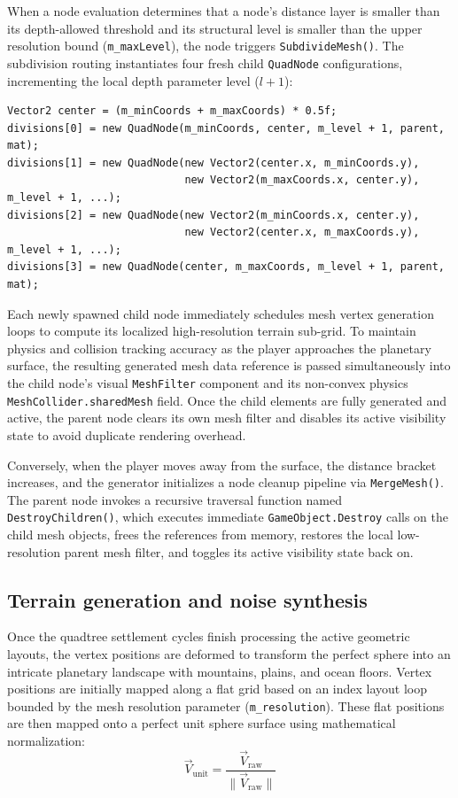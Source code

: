 \documentclass[12pt]{report}
\begin{document}
When a node evaluation determines that a node's distance layer is smaller than its depth-allowed threshold and its structural level is smaller than the upper resolution bound (\texttt{m\_maxLevel}), the node triggers \texttt{SubdivideMesh()}. The subdivision routing instantiates four fresh child \texttt{QuadNode} configurations, incrementing the local depth parameter level ($l+1$):

\begin{verbatim}
Vector2 center = (m_minCoords + m_maxCoords) * 0.5f;
divisions[0] = new QuadNode(m_minCoords, center, m_level + 1, parent, mat);
divisions[1] = new QuadNode(new Vector2(center.x, m_minCoords.y), 
                            new Vector2(m_maxCoords.x, center.y), m_level + 1, ...);
divisions[2] = new QuadNode(new Vector2(m_minCoords.x, center.y), 
                            new Vector2(center.x, m_maxCoords.y), m_level + 1, ...);
divisions[3] = new QuadNode(center, m_maxCoords, m_level + 1, parent, mat);
\end{verbatim}

Each newly spawned child node immediately schedules mesh vertex generation loops to compute its localized high-resolution terrain sub-grid. To maintain physics and collision tracking accuracy as the player approaches the planetary surface, the resulting generated mesh data reference is passed simultaneously into the child node's visual \texttt{MeshFilter} component and its non-convex physics \texttt{MeshCollider.sharedMesh} field. Once the child elements are fully generated and active, the parent node clears its own mesh filter and disables its active visibility state to avoid duplicate rendering overhead.

Conversely, when the player moves away from the surface, the distance bracket increases, and the generator initializes a node cleanup pipeline via \texttt{MergeMesh()}. The parent node invokes a recursive traversal function named \texttt{DestroyChildren()}, which executes immediate \texttt{GameObject.Destroy} calls on the child mesh objects, frees the references from memory, restores the local low-resolution parent mesh filter, and toggles its active visibility state back on.

\subsection{Terrain generation and noise synthesis}

Once the quadtree settlement cycles finish processing the active geometric layouts, the vertex positions are deformed to transform the perfect sphere into an intricate planetary landscape with mountains, plains, and ocean floors. Vertex positions are initially mapped along a flat grid based on an index layout loop bounded by the mesh resolution parameter (\texttt{m\_resolution}). These flat positions are then mapped onto a perfect unit sphere surface using mathematical normalization:
\begin{equation}
\vec{V}_{\text{unit}} = \frac{\vec{V}_{\text{raw}}}{\|\vec{V}_{\text{raw}}\|}
\end{equation}
\end{document}
